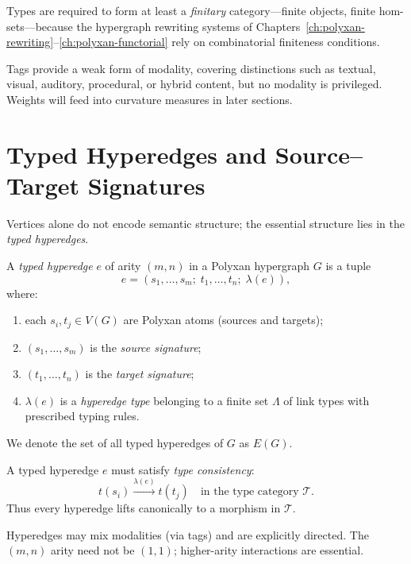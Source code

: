 Types are required to form at least a \emph{finitary} category---finite
objects, finite hom-sets---because the hypergraph rewriting systems of
Chapters~\ref{ch:polyxan-rewriting}--\ref{ch:polyxan-functorial} rely on
combinatorial finiteness conditions.

Tags provide a weak form of modality, covering distinctions such as textual,
visual, auditory, procedural, or hybrid content, but no modality is privileged.
Weights will feed into curvature measures in later sections.

\section{Typed Hyperedges and Source--Target Signatures}

Vertices alone do not encode semantic structure; the essential structure lies in
the \emph{typed hyperedges}.

\begin{definition}
A \emph{typed hyperedge} $e$ of arity $(m,n)$ in a Polyxan hypergraph $G$ is a
tuple
\[
e = (s_1,\ldots,s_m;\; t_1,\ldots,t_n;\; \lambda(e)),
\]
where:
\begin{enumerate}
  \item each $s_i,t_j \in V(G)$ are Polyxan atoms (sources and targets);
  \item $(s_1,\ldots,s_m)$ is the \emph{source signature};
  \item $(t_1,\ldots,t_n)$ is the \emph{target signature};
  \item $\lambda(e)$ is a \emph{hyperedge type} belonging to a finite set
        $\Lambda$ of link types with prescribed typing rules.
\end{enumerate}
We denote the set of all typed hyperedges of $G$ as $E(G)$.
\end{definition}

A typed hyperedge $e$ must satisfy \emph{type consistency}:
\[
t(s_i) \xrightarrow{\lambda(e)} t(t_j)
\quad
\text{in the type category } \mathcal{T}.
\]
Thus every hyperedge lifts canonically to a morphism in $\mathcal{T}$.

\begin{remark}
Hyperedges may mix modalities (via tags) and are explicitly directed.
The $(m,n)$ arity need not be $(1,1)$; higher-arity interactions are essential.
\end{remark}

